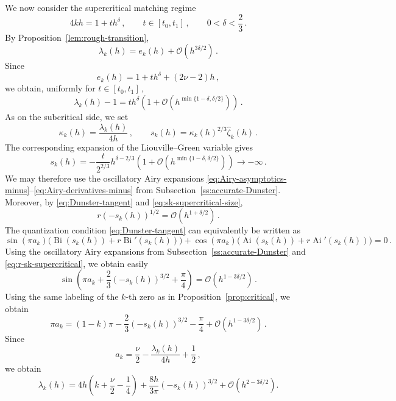 \documentclass[11pt]{amsart}
\numberwithin{equation}{section}
\theoremstyle{remark}
\newcommand{\Ai}{\operatorname{Ai}}
\newcommand{\Bi}{\operatorname{Bi}}
\begin{document}
We now consider the supercritical matching regime
\begin{equation}\label{eq:supercritical-matching-regime}
	4kh=1+th^\delta\,,
	\qquad
	t\in[t_0,t_1]\,,
	\qquad
	0<\delta<\frac23\,.
\end{equation}
By Proposition~\ref{lem:rough-transition},
\[
\lambda_k(h)
=
e_k(h)+\mathcal O(h^{3\delta/2})\,.
\]
Since
\[
e_k(h)
=
1+th^\delta+(2\nu-2)h\,,
\]
we obtain, uniformly for $t\in[t_0,t_1]\,$,
\begin{equation}\label{eq:lambda-supercritical-size}
	\lambda_k(h)-1
	=
	th^\delta
	\left(
	1+
	\mathcal O\left(
	h^{\min\{1-\delta,\delta/2\}}
	\right)
	\right)\,.
\end{equation}
As on the subcritical side, we set
\[
\kappa_k(h)
=
\frac{\lambda_k(h)}{4h}\,,
\qquad
s_k(h)
=
\kappa_k(h)^{2/3}\widehat\zeta_k(h)\,.
\]
The corresponding expansion of the Liouville--Green variable gives
\begin{equation}\label{eq:sk-supercritical-size}
	s_k(h)
	=
	-\frac{t}{2^{2/3}}
	h^{\delta-2/3}
	\left(
	1+
	\mathcal O\left(
	h^{\min\{1-\delta,\delta/2\}}
	\right)
	\right)
	\longrightarrow-\infty\,.
\end{equation}
We may therefore use the oscillatory Airy expansions
\eqref{eq:Airy-asymptotics-minus}--\eqref{eq:Airy-derivatives-minus}
from Subsection~\ref{ss:accurate-Dunster}. Moreover, by \eqref{eq:Dunster-tangent} and
\eqref{eq:sk-supercritical-size},
\begin{equation}\label{eq:r-sk-supercritical}
	r(-s_k(h))^{1/2}
	=
	\mathcal O(h^{1+\delta/2})\,.
\end{equation}
The quantization condition \eqref{eq:Dunster-tangent} can equivalently
be written as
\[
\sin(\pi a_k)
\bigl(
\Bi(s_k(h))+r\Bi'(s_k(h))
\bigr)
+
\cos(\pi a_k)
\bigl(
\Ai(s_k(h))+r\Ai'(s_k(h))
\bigr)
=0\,.
\]
Using the oscillatory Airy expansions from
Subsection~\ref{ss:accurate-Dunster} and
\eqref{eq:r-sk-supercritical}, we obtain easily
\begin{equation}\label{eq:supercritical-phase-condition}
	\sin\left(
	\pi a_k
	+
	\frac23(-s_k(h))^{3/2}
	+
	\frac\pi4
	\right)
	=
	\mathcal O\left(h^{1-3\delta/2}\right)\,.
\end{equation}
Using the same labeling of the $k$-th zero as in Proposition~\ref{prop:critical},
we obtain
\[
\pi a_k
=
(1-k)\pi
-
\frac23(-s_k(h))^{3/2}
-
\frac\pi4
+
\mathcal O\left(h^{1-3\delta/2}\right)\,.
\]
Since
\[
a_k
=
\frac{\nu}{2}
-
\frac{\lambda_k(h)}{4h}
+
\frac12\,,
\]
we obtain
\begin{equation}\label{eq:lambda-supercritical-Airy}
	\lambda_k(h)
	=
	4h\left(
	k+\frac\nu2-\frac14
	\right)
	+
	\frac{8h}{3\pi}
	(-s_k(h))^{3/2}
	+
	\mathcal O\left(h^{2-3\delta/2}\right).
\end{equation}
\end{document}
